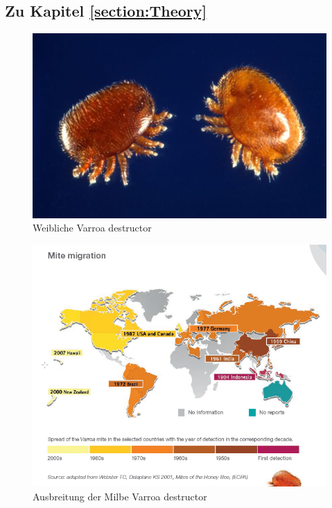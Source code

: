 \documentclass[11pt,a4paper]{article}
\begin{document}
\subsection{Zu Kapitel \autoref{section:Theory}}
\begin{figure}[H]
    \centering
    \includegraphics[width = .7\textwidth]{images/Varroamilbe.jpg}
    \caption{Weibliche Varroa destructor}
    \label{fig:annotated_edited}
\end{figure}

\begin{figure}[H]
    \centering
    \includegraphics[width = .7\textwidth]{images/Verbreitung Varroamilbe.png}
    \caption{Ausbreitung der Milbe Varroa destructor}
    \label{fig:annotated_edited}
\end{figure}
\end{document}

